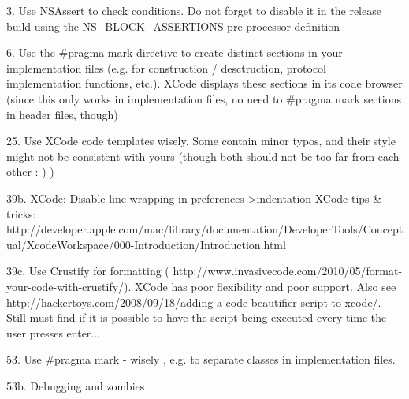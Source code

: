 3. Use NSAssert to check conditions. Do not forget to disable it in the release build using the NS_BLOCK_ASSERTIONS pre-processor definition

6. Use the #pragma mark directive to create distinct sections in your implementation files (e.g. for construction / desctruction, protocol implementation functions, etc.). XCode displays these sections in its code browser (since this only works in implementation files, no need to #pragma mark sections in header files, though)

25. Use XCode code templates wisely. Some contain minor typos, and their style might not be consistent with yours (though both should not be too far from each other :-) )

39b. XCode: Disable line wrapping in preferences->indentation 
XCode tips & tricks: http://developer.apple.com/mac/library/documentation/DeveloperTools/Conceptual/XcodeWorkspace/000-Introduction/Introduction.html

39c. Use Crustify for formatting ( http://www.invasivecode.com/2010/05/format-your-code-with-crustify/). XCode has poor flexibility and poor
support. Also see http://hackertoys.com/2008/09/18/adding-a-code-beautifier-script-to-xcode/. Still must find if it is possible to have the script being executed every time the user presses enter...

53. Use #pragma mark - wisely , e.g. to separate classes in implementation files.

53b. Debugging and zombies